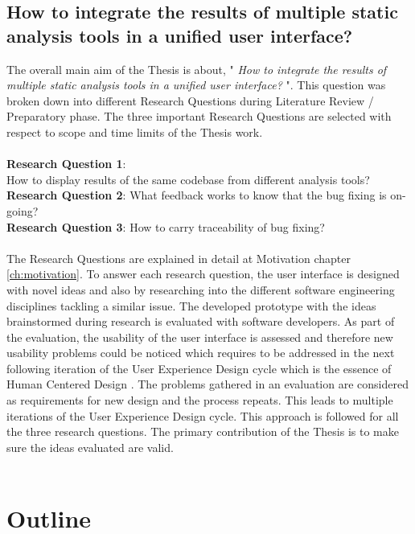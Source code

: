 \subsection{How to integrate the results of multiple static analysis tools in a unified user interface?}

The overall main aim of the Thesis is about, " \textit{How to integrate the results of multiple static analysis tools in a unified user interface?} ". This question was broken down into different Research Questions during Literature Review / Preparatory phase. The three important Research Questions are selected with respect to scope and time limits of the Thesis work. \\ \\

\noindent\textbf{Research Question 1}: \\ How to display results of the same codebase from different analysis tools? \\
\textbf{Research Question 2}: What feedback works to know that the bug fixing is on-going? \\
\textbf{Research Question 3}: How to carry traceability of bug fixing? \\ \\

The Research Questions are explained in detail at Motivation chapter \ref{ch:motivation}. To answer each research question, the user interface is designed with novel ideas and also by researching into  the different software engineering disciplines tackling a similar issue. The developed prototype with the ideas brainstormed during research is evaluated with software developers. As part of the evaluation, the usability  \cite{usability} of the user interface is assessed and therefore new usability problems could be noticed which requires to be addressed in the next following iteration of the User Experience Design cycle \cite{UXD} which is the essence of Human Centered Design \cite{hcd}. The problems gathered in an evaluation are considered as requirements for new design and the process repeats. This leads to multiple iterations of the User Experience Design cycle. This approach is followed for all the three research questions. The primary contribution of the Thesis is to make sure the ideas evaluated are valid. \\ \\

\section{Outline}


